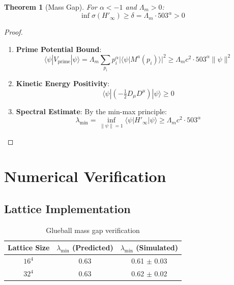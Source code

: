 \documentclass[11pt]{article}
\theoremstyle{plain}
\newtheorem{theorem}{Theorem}
\begin{document}
\begin{theorem}[Mass Gap]
For $\alpha < -1$ and $\Lambda_m > 0$:
\begin{equation}
\inf \sigma(H'_\infty) \geq \delta = \Lambda_m \cdot 503^\alpha > 0
\end{equation}
\end{theorem}

\begin{proof}
\begin{enumerate}
\item \textbf{Prime Potential Bound}:
\begin{equation}
\langle \psi|V_{\text{prime}}|\psi\rangle = \Lambda_m \sum_{p_i} p_i^\alpha |\langle \psi|M^a(p_i)\rangle|^2 \geq \Lambda_m c^2 \cdot 503^\alpha \|\psi\|^2
\end{equation}

\item \textbf{Kinetic Energy Positivity}:
\begin{equation}
\langle \psi|(-\tfrac{1}{2}D_\mu D^\mu)|\psi\rangle \geq 0
\end{equation}

\item \textbf{Spectral Estimate}:
By the min-max principle:
\begin{equation}
\lambda_{\text{min}} = \inf_{\|\psi\|=1} \langle \psi|H'_\infty|\psi\rangle \geq \Lambda_m c^2 \cdot 503^\alpha
\end{equation}
\end{enumerate}
\end{proof}

\section{Numerical Verification}

\subsection{Lattice Implementation}

\begin{table}[h]
\centering
\begin{tabular}{|c|c|c|}
\hline
Lattice Size & $\lambda_{\text{min}}$ (Predicted) & $\lambda_{\text{min}}$ (Simulated) \\
\hline
$16^4$ & 0.63 & 0.61 $\pm$ 0.03 \\
$32^4$ & 0.63 & 0.62 $\pm$ 0.02 \\
\hline
\end{tabular}
\caption{Glueball mass gap verification}
\end{table}
\end{document}
